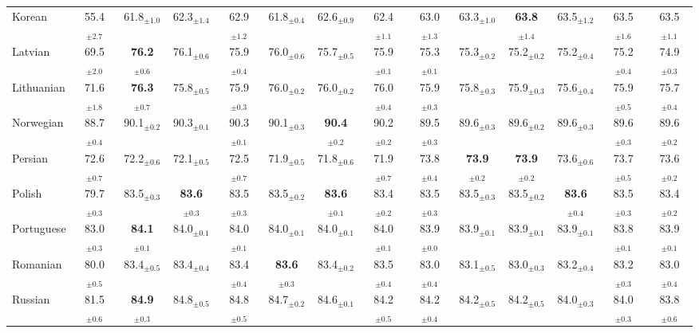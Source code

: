 \begin{table*}[ht]
{\begin{tabular}{lccccccccccccc}
Korean & 55.4$_{\pm 2.7}$ & 61.8$_{\pm 1.0}$ & 62.3$_{\pm 1.4}$ & 62.9$_{\pm 1.2}$ & 61.8$_{\pm 0.4}$ & 62.6$_{\pm 0.9}$ & 62.4$_{\pm 1.1}$ & 63.0$_{\pm 1.3}$ & 63.3$_{\pm 1.0}$ & \textbf{63.8}$_{\pm 1.4}$ & 63.5$_{\pm 1.2}$ & 63.5$_{\pm 1.6}$ & 63.5$_{\pm 1.1}$ \\
Latvian & 69.5$_{\pm 2.0}$ & \textbf{76.2}$_{\pm 0.6}$ & 76.1$_{\pm 0.6}$ & 75.9$_{\pm 0.4}$ & 76.0$_{\pm 0.6}$ & 75.7$_{\pm 0.5}$ & 75.9$_{\pm 0.1}$ & 75.3$_{\pm 0.1}$ & 75.3$_{\pm 0.2}$ & 75.2$_{\pm 0.2}$ & 75.2$_{\pm 0.4}$ & 75.2$_{\pm 0.4}$ & 74.9$_{\pm 0.3}$ \\
Lithuanian & 71.6$_{\pm 1.8}$ & \textbf{76.3}$_{\pm 0.7}$ & 75.8$_{\pm 0.5}$ & 75.9$_{\pm 0.3}$ & 76.0$_{\pm 0.2}$ & 76.0$_{\pm 0.2}$ & 76.0$_{\pm 0.4}$ & 75.9$_{\pm 0.3}$ & 75.8$_{\pm 0.3}$ & 75.9$_{\pm 0.3}$ & 75.6$_{\pm 0.4}$ & 75.9$_{\pm 0.5}$ & 75.7$_{\pm 0.4}$ \\
Norwegian & 88.7$_{\pm 0.4}$ & 90.1$_{\pm 0.2}$ & 90.3$_{\pm 0.1}$ & 90.3$_{\pm 0.1}$ & 90.1$_{\pm 0.3}$ & \textbf{90.4}$_{\pm 0.2}$ & 90.2$_{\pm 0.2}$ & 89.5$_{\pm 0.3}$ & 89.6$_{\pm 0.3}$ & 89.6$_{\pm 0.2}$ & 89.6$_{\pm 0.3}$ & 89.6$_{\pm 0.3}$ & 89.6$_{\pm 0.2}$ \\
Persian & 72.6$_{\pm 0.7}$ & 72.2$_{\pm 0.6}$ & 72.1$_{\pm 0.5}$ & 72.5$_{\pm 0.7}$ & 71.9$_{\pm 0.5}$ & 71.8$_{\pm 0.6}$ & 71.9$_{\pm 0.7}$ & 73.8$_{\pm 0.4}$ & \textbf{73.9}$_{\pm 0.2}$ & \textbf{73.9}$_{\pm 0.2}$ & 73.6$_{\pm 0.6}$ & 73.7$_{\pm 0.5}$ & 73.6$_{\pm 0.2}$ \\
Polish & 79.7$_{\pm 0.3}$ & 83.5$_{\pm 0.3}$ & \textbf{83.6}$_{\pm 0.3}$ & 83.5$_{\pm 0.3}$ & 83.5$_{\pm 0.2}$ & \textbf{83.6}$_{\pm 0.1}$ & 83.4$_{\pm 0.2}$ & 83.5$_{\pm 0.3}$ & 83.5$_{\pm 0.3}$ & 83.5$_{\pm 0.2}$ & \textbf{83.6}$_{\pm 0.4}$ & 83.5$_{\pm 0.3}$ & 83.4$_{\pm 0.2}$ \\
Portuguese & 83.0$_{\pm 0.3}$ & \textbf{84.1}$_{\pm 0.1}$ & 84.0$_{\pm 0.1}$ & 84.0$_{\pm 0.1}$ & 84.0$_{\pm 0.1}$ & 84.0$_{\pm 0.1}$ & 84.0$_{\pm 0.1}$ & 83.9$_{\pm 0.0}$ & 83.9$_{\pm 0.1}$ & 83.9$_{\pm 0.1}$ & 83.9$_{\pm 0.1}$ & 83.8$_{\pm 0.1}$ & 83.9$_{\pm 0.1}$ \\
Romanian & 80.0$_{\pm 0.5}$ & 83.4$_{\pm 0.5}$ & 83.4$_{\pm 0.4}$ & 83.4$_{\pm 0.4}$ & \textbf{83.6}$_{\pm 0.3}$ & 83.4$_{\pm 0.2}$ & 83.5$_{\pm 0.4}$ & 83.0$_{\pm 0.4}$ & 83.1$_{\pm 0.5}$ & 83.0$_{\pm 0.3}$ & 83.2$_{\pm 0.4}$ & 83.2$_{\pm 0.3}$ & 83.0$_{\pm 0.4}$ \\
Russian & 81.5$_{\pm 0.6}$ & \textbf{84.9}$_{\pm 0.3}$ & 84.8$_{\pm 0.5}$ & 84.8$_{\pm 0.5}$ & 84.7$_{\pm 0.2}$ & 84.6$_{\pm 0.1}$ & 84.2$_{\pm 0.5}$ & 84.2$_{\pm 0.4}$ & 84.2$_{\pm 0.5}$ & 84.2$_{\pm 0.5}$ & 84.0$_{\pm 0.3}$ & 84.0$_{\pm 0.3}$ & 83.8$_{\pm 0.6}$ \\

\end{tabular}}
\end{table*}
